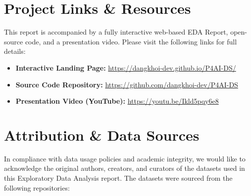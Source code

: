\documentclass[twoside]{hcmut-report}
\begin{document}
\section*{Project Links \& Resources}

This report is accompanied by a fully interactive web-based EDA Report, open-source code, and a presentation video. Please visit the following links for full details:

\begin{itemize}
    \item \textbf{Interactive Landing Page:} \url{https://dangkhoi-dev.github.io/P4AI-DS/}
    \item \textbf{Source Code Repository:} \url{https://github.com/dangkhoi-dev/P4AI-DS}
    \item \textbf{Presentation Video (YouTube):} \url{https://youtu.be/Ikld5pqy6e8}
\end{itemize}

\section*{Attribution \& Data Sources}

In compliance with data usage policies and academic integrity, we would like to acknowledge the original authors, creators, and curators of the datasets used in this Exploratory Data Analysis report. The datasets were sourced from the following repositories:
\end{document}
